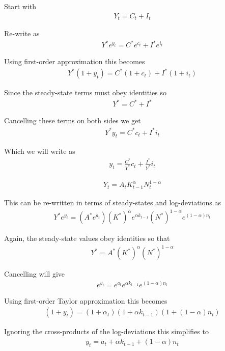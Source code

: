 \documentclass{beamer}
\begin{document}
\begin{frame}
  Start with
\begin{align} Y_t=C_t+I_t \end{align}

Re-write as
\begin{align} Y^*e^{y_t}=C^*e^{c_t}+I^*e^{i_t} \end{align}

Using first-order approximation this becomes
\begin{align} Y^*(1+y_t) = C^*(1+c_t) + I^*(1+i_t) \end{align}

Since the steady-state terms must obey identities so
\begin{align} Y^* = C^* + I^* \end{align}

Cancelling these terms on both sides we get
\begin{align} Y^*y_t = C^*c_t + I^*i_t \end{align}

Which we will write as
\begin{align} y_t=\frac{C^*}{Y^*}c_t+\frac{I^*}{Y^*}i_t \end{align}
\end{frame}

\begin{frame}
  \begin{align}Y_t=A_tK^{\alpha}_{t-1}N^{1-\alpha}_t \end{align}

This can be re-written in terms of steady-states and log-deviations as
\begin{align} Y^*e^{y_t} = (A^* e^{a_t}) (K^*)^{\alpha}e^{\alpha k_{t-1}} (N^*)^{1-\alpha}e^{(1-\alpha)n_t}\end{align}

Again, the steady-state values obey identities so that
\begin{align} Y^* = A^* (K^*)^{\alpha} (N^*)^{1-\alpha} \end{align}

Cancelling will give
\begin{align}e^{y_t}=e^{a_t}e^{\alpha k_{t-1}}e^{(1-\alpha)n_t} \end{align}

Using first-order Taylor approximation this becomes
\begin{align}
  (1+y_t)=(1+\alpha_t)(1+\alpha k_{t-1})(1+(1-\alpha)n_t)
\end{align}

Ignoring the cross-products of the log-deviations this simplifies to
\begin{align} y_t=a_t+\alpha k_{t-1} + (1-\alpha)n_t \end{align}

\end{frame}
\end{document}
